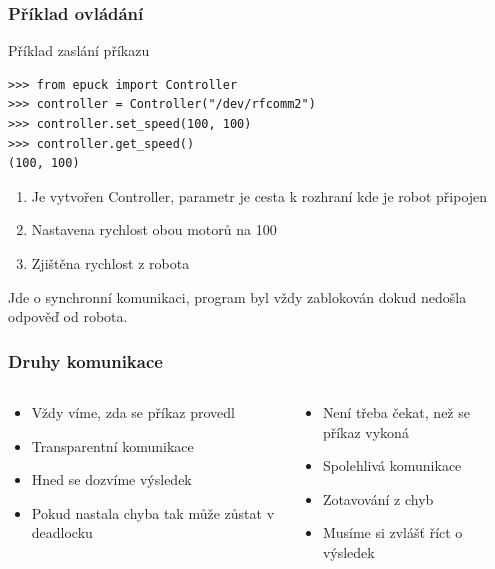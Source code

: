 \documentclass{beamer}
\begin{document}
\begin{frame}[fragile]
    \frametitle{Příklad ovládání}
    \begin{exampleblock}{Příklad zaslání příkazu}
    \begin{verbatim}
>>> from epuck import Controller
>>> controller = Controller("/dev/rfcomm2")
>>> controller.set_speed(100, 100)
>>> controller.get_speed()
(100, 100)
    \end{verbatim}
    \end{exampleblock}
    \begin{enumerate}
        \item Je vytvořen Controller, parametr je cesta k rozhraní kde
        je robot připojen
        \item Nastavena rychlost obou motorů na 100
        \item Zjištěna rychlost z robota
    \end{enumerate}

    Jde o synchronní komunikaci, program byl vždy zablokován dokud nedošla
    odpověď od robota.
\end{frame}

\begin{frame}[t]
    \frametitle{Druhy komunikace}
    \begin{columns}
        \begin{column}{.5\textwidth}
            \vskip0.5cm
        \end{column}
        \begin{column}{.5\textwidth}
        \end{column}
    \end{columns}
    \vskip0.5cm

    \begin{columns}
        \begin{column}{.5\textwidth}
            \begin{itemize}
                \item Vždy víme, zda se příkaz provedl
                \item Transparentní komunikace
                \item Hned se dozvíme výsledek
                \item Pokud nastala chyba tak může zůstat v deadlocku
            \end{itemize}
        \end{column}
        \begin{column}{.5\textwidth}
            \begin{itemize}
                \item Není třeba čekat, než se příkaz vykoná
                \item Spolehlivá komunikace
                \item Zotavování z chyb
                \item Musíme si zvlášť říct o výsledek
            \end{itemize}
        \end{column}
    \end{columns}
\end{frame}
\end{document}
